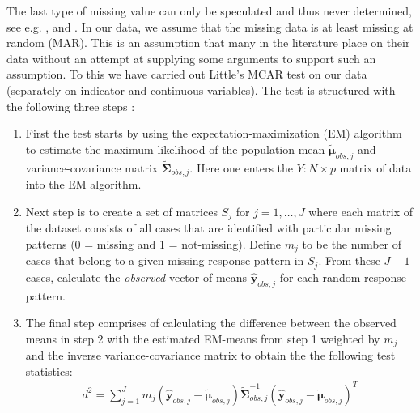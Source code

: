 \documentclass[../thesis.tex]{subfiles}
\begin{document}
\noindent The last type of missing value can only be speculated and thus never determined, see e.g. \cite{rubin1976inference}, \cite{schafer2002missing} and \cite{moons2006using}. In our data, we assume that the missing data is at least missing at random (MAR). This is an assumption that many in the literature place on their data without an attempt at supplying some arguments to support such an assumption. To this we have carried out Little's MCAR test \citep{little1988test} on our data (separately on indicator and continuous variables). The test is structured with the following three steps : 
\begin{enumerate}[label=(\roman*)]
    \item First the test starts by using the expectation-maximization (EM) algorithm \citep{dempster1977maximum} to estimate the maximum likelihood of the population mean $\bm{\tilde{\mu}}_{obs, j}$ and variance-covariance matrix $\bm{\tilde{\Sigma}}_{obs,j}$. Here one enters the $Y:N\times p$ matrix of data into the EM algorithm.
    \item Next step is to create a set of matrices $S_j$ for $j = 1, \hdots, J$ where each matrix of the dataset consists of all cases that are identified with particular missing patterns (0 = missing and 1 = not-missing). Define $m_j$ to be the number of cases that belong to a given missing response pattern in $S_j$. From these $J-1$ cases, calculate the \textit{observed} vector of means $\bm{\hat{y}}_{obs, j}$ for each random response pattern. 
    \item The final step comprises of calculating the difference between the observed means in step 2 with the estimated EM-means from step 1 weighted by $m_j$ and the inverse variance-covariance matrix to obtain the the following test statistics:
    \begin{align}
        d^2 = \sum_{j=1}^J m_j \left(\bm{\hat{y}}_{obs, j} -  \bm{\tilde{\mu}}_{obs, j}\right)\bm{\tilde{\Sigma}}_{obs,j}^{-1}\left(\bm{\hat{y}}_{obs, j} -  \bm{\tilde{\mu}}_{obs, j}\right)^T
    \end{align}
\end{enumerate}
\end{document}
